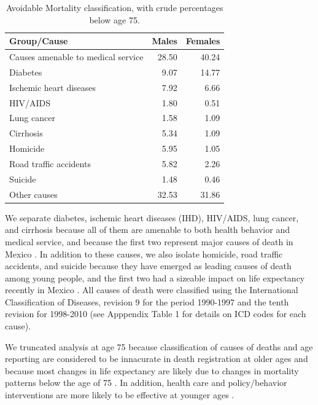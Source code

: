 \documentclass{article}
\begin{document}
\begin{table}[ht]
\centering
\caption{Avoidable Mortality classification, with crude percentages below age 75.}
\label{tab:causes}
\begin{tabular}{>{\raggedright}m{3cm}rr}
Group/Cause  & Males & Females \\ 
  \hline
Causes amenable to medical service & 28.50 & 40.24 \\ 
  Diabetes & 9.07 & 14.77 \\ 
  Ischemic heart diseases & 7.92 & 6.66 \\ 
  HIV/AIDS & 1.80 & 0.51 \\ 
  Lung cancer & 1.58 & 1.09 \\ 
  Cirrhosis & 5.34 & 1.09 \\ 
  Homicide & 5.95 & 1.05 \\ 
  Road traffic accidents & 5.82 & 2.26 \\ 
  Suicide & 1.48 & 0.46 \\ 
  Other causes & 32.53 & 31.86 \\ 
   \hline
\end{tabular}
\end{table}

We separate diabetes, ischemic heart diseases (IHD), HIV/AIDS, lung
cancer, and cirrhosis because all of them are amenable to both health behavior
and medical service, and because the first two represent major causes of death
in Mexico \citep{canudas2014}. In addition to these causes, we also isolate
homicide, road traffic accidents, and suicide because they have emerged as
leading causes of death among young people, and the first two had a sizeable
impact on life expectancy recently in Mexico \citep{canudas2014}. All causes of death were classified using the International Classification of Diseases, revision 9 for the period 1990-1997 and the tenth revision for 1998-2010 (see Apppendix Table 1 for details on ICD codes for each cause).

We truncated analysis at age 75 because classification of causes of deaths and age reporting are considered to be innacurate in death registration at older ages \citep{tobias2001} and because most changes in life expectancy are likely due to changes in mortality patterns below the age of 75 \citep{Aburto2015}. In addition, health care and policy/behavior interventions are more likely to be effective at younger ages \cite{elo2014}.
\end{document}
